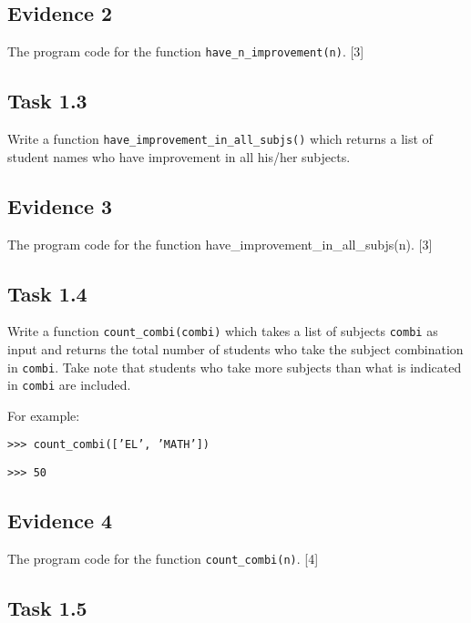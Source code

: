 \subsection*{Evidence 2}

The program code for the function \texttt{have\_n\_improvement(n)}.\hfill{}
{[}3{]}

\subsection*{Task 1.3 }

Write a function \texttt{have\_improvement\_in\_all\_subjs()} which
returns a list of student names who have improvement in all his/her
subjects. 

\subsection*{Evidence 3}

The program code for the function have\_improvement\_in\_all\_subjs(n).\hfill{}
{[}3{]}

\subsection*{Task 1.4 }

Write a function \texttt{count\_combi(combi)} which takes a list of
subjects \texttt{combi} as input and returns the total number of students
who take the subject combination in \texttt{combi}. Take note that
students who take more subjects than what is indicated in \texttt{combi}
are included. 

For example:

\noindent\begin{minipage}[t]{1\columnwidth}%
\texttt{>\textcompwordmark >\textcompwordmark > count\_combi({[}'EL',
'MATH'{]}) }

\texttt{>\textcompwordmark >\textcompwordmark > 50 }%
\end{minipage}

\subsection*{Evidence 4 }

The program code for the function \texttt{count\_combi(n)}. \hfill{}{[}4{]}

\subsection*{Task 1.5}


